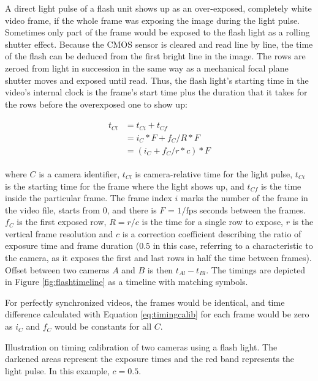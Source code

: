
A direct light pulse of a flash unit shows up as an over-exposed, completely white video frame, if the whole frame was exposing the image during the light pulse.
Sometimes only part of the frame would be exposed to the flash light as a rolling shutter effect.
Because the CMOS sensor is cleared and read line by line, the time of the flash can be deduced from the first bright line in the image.
The rows are zeroed from light in succession in the same way as a mechanical focal plane shutter moves and exposed until read.
Thus, the flash light's starting time in the video's internal clock is the frame's start time plus the duration that it takes for the rows before the overexposed one to show up:

\begin{align} \begin{split} \label{eq:timingcalib}
t_{Cl} &= t_{Ci} + t_{Cf} \\
&= i_C * F + f_C / R * F \\
&= (i_C + f_C / r * c) * F
\end{split} \end{align}

where $C$ is a camera identifier, $t_{Cl}$ is camera-relative time for the light pulse, $t_{Ci}$ is the starting time for the frame where the light shows up, and $t_{Cf}$ is the time inside the particular frame.
The frame index $i$ marks the number of the frame in the video file, starts from 0, and there is $F$ = $1/\text{fps}$ seconds between the frames.
$f_C$ is the first exposed row, $R = r / c$ is the time for a single row to expose, $r$ is the vertical frame resolution and $c$ is a correction coefficient describing the ratio of exposure time and frame duration ($0.5$ in this case, referring to a characteristic to the camera, as it exposes the first and last rows in half the time between frames).
Offset between two cameras $A$ and $B$ is then $t_{Al} - t_{Bl}$.
The timings are depicted in Figure \ref{fig:flashtimeline} as a timeline with matching symbols.

For perfectly synchronized videos, the frames would be identical, and time difference calculated with Equation \ref{eq:timingcalib} for each frame would be zero as $i_C$ and $f_C$ would be constants for all $C$.

{Illustration on timing calibration of two cameras using a flash light.
The darkened areas represent the exposure times and the red band represents the light pulse.
In this example, $c = 0.5$.
}

